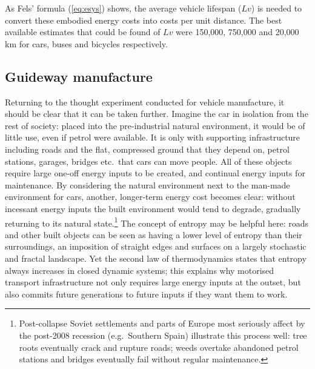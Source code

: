 As Fels' formula (\cref{eq:esys}) shows, the average vehicle lifespan
($Lv$) is
needed to convert these embodied energy costs into costs per unit distance.
The best available estimates that could be found of 
$Lv$ were 150,000, 750,000 and 20,000 km for cars, buses and bicycles
respectively.


\subsection{Guideway manufacture} 
Returning to the thought experiment conducted for vehicle manufacture, it
should be clear that it can be taken further. Imagine the car in isolation
from the rest of society: placed into the pre-industrial natural environment,
it would be of little use, even if petrol were available.
It is only with supporting infrastructure including roads and the flat,
compressed ground that they depend on, petrol stations, garages, bridges
etc.~that cars can move people. All of these objects require large one-off
energy inputs to be created, and continual energy inputs for maintenance. By
considering the natural environment next to the
man-made environment for cars, another, longer-term energy cost becomes clear:
without incessant energy inputs the built environment would tend to degrade,
gradually returning to its natural
state.\footnote{Post-collapse Soviet settlements
and parts of Europe most seriously affect by the post-2008 recession
(e.g.~Southern Spain)
illustrate this process well: tree roots eventually crack and rupture roads;
weeds overtake abandoned petrol stations and bridges eventually fail without
regular maintenance.
}
The concept of entropy may be helpful here: roads and other built objects
can be seen as having a lower level of entropy than their surroundings, an
imposition of straight edges and surfaces on a largely stochastic and fractal
landscape. Yet the second law of thermodynamics states that entropy always
increases in closed dynamic systems; this explains why motorised transport
infrastructure not only requires large energy inputs at the outset, but also
commits future generations to future inputs if they want them to work.

